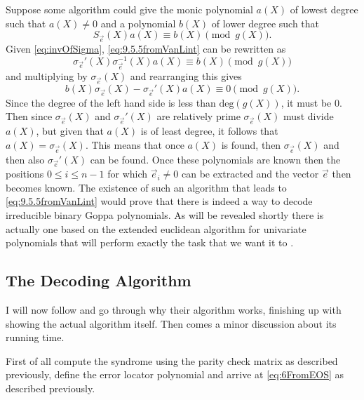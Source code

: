 Suppose some algorithm could give the monic polynomial $a\left(X\right)$ of lowest degree such that $a\left(X\right) \neq 0$ and a polynomial $b\left(X\right)$ of lower degree such that
\begin{equation}
\label{eq:9.5.5fromVanLint}
S_{\vec{e}}\left(X\right) a\left(X\right) \equiv b\left(X\right) \pmod {g\left(X\right)}.
\end{equation}
Given \cref{eq:invOfSigma}, \cref{eq:9.5.5fromVanLint} can be rewritten as
\[
	\sigma_{\vec{e}}'\left(X\right) \sigma_{\vec{e}}^{-1}\left(X\right) a\left(X\right) \equiv b\left(X\right) \pmod {g\left(X\right)}
\]
and multiplying by $\sigma_{\vec{e}}\left(X\right)$ and rearranging this gives
\[
	b\left(X\right) \sigma_{\vec{e}}\left(X\right) - \sigma_{\vec{e}}'\left(X\right)a\left(X\right) \equiv 0 \pmod {g\left(X\right)}.
\]
Since the degree of the left hand side is less than $\mathrm{deg}\left(g\left(X\right)\right)$, it must be $0$. Then since $\sigma_{\vec{e}}\left(X\right)$ and $\sigma_{\vec{e}}'\left(X\right)$ are relatively prime $\sigma_{\vec{e}}\left(X\right)$ must divide $a\left(X\right)$, but given that $a\left(X\right)$ is of least degree, it follows that $a\left(X\right) = \sigma_{\vec{e}}\left(X\right)$. This means that once $a\left(X\right)$ is found, then $\sigma_{\vec{e}}\left(X\right)$ and then also $\sigma_{\vec{e}}'\left(X\right)$ can be found. Once these polynomials are known then the positions $0 \leq i \leq n-1$ for which $\vec{e}_i \neq 0$ can be extracted and the vector $\vec{e}$ then becomes known. The existence of such an algorithm that leads to \cref{eq:9.5.5fromVanLint} would prove that there is indeed a way to decode irreducible binary Goppa polynomials. As will be revealed shortly there is actually one based on the extended euclidean algorithm for univariate polynomials that will perform exactly the task that we want it to \cite[pp. 144-145]{vanlint}\cite{EOS}.



\subsection{The Decoding Algorithm}
\label{subsec:EOSalgorithm}

I will now follow \cite{EOS} and go through why their algorithm works, finishing up with showing the actual algorithm itself. Then comes a minor discussion about its running time.

First of all compute the syndrome using the parity check matrix as described previously, define the error locator polynomial and arrive at \cref{eq:6FromEOS} as described previously.

